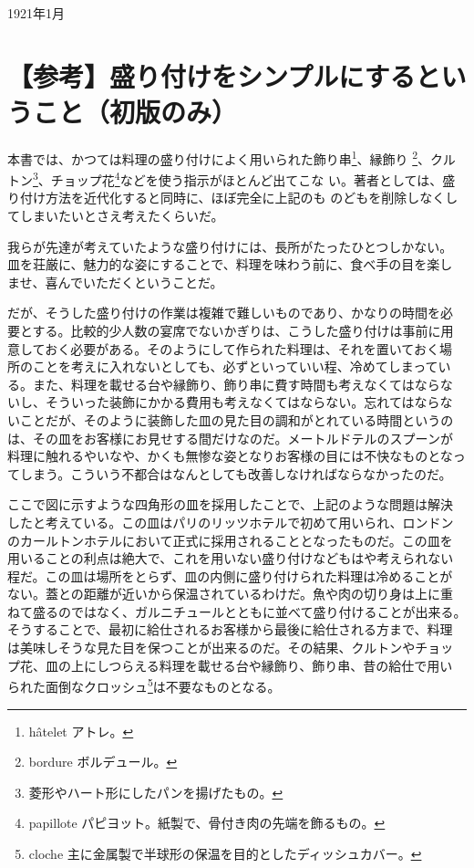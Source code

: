 \begin{flushright}
1921年1月
\end{flushright}

\newpage
\small
{}

\hypertarget{remarque-sur-la-simplification-des-procedes-de-dressage}{%
\section{【参考】盛り付けをシンプルにするということ（初版のみ）}\label{remarque-sur-la-simplification-des-procedes-de-dressage}}

本書では、かつては料理の盛り付けによく用いられた飾り串\footnote{hâtelet
  アトレ。}、縁飾り \footnote{bordure ボルデュール。}、クルトン\footnote{菱形やハート形にしたパンを揚げたもの。}、チョップ花\footnote{papillote
  パピヨット。紙製で、骨付き肉の先端を飾るもの。}などを使う指示がほとんど出てこな
い。著者としては、盛り付け方法を近代化すると同時に、ほぼ完全に上記のも
のどもを削除しなくしてしまいたいとさえ考えたくらいだ。

我らが先達が考えていたような盛り付けには、長所がたったひとつしかない。
皿を荘厳に、魅力的な姿にすることで、料理を味わう前に、食べ手の目を楽し
ませ、喜んでいただくということだ。

だが、そうした盛り付けの作業は複雑で難しいものであり、かなりの時間を必
要とする。比較的少人数の宴席でないかぎりは、こうした盛り付けは事前に用
意しておく必要がある。そのようにして作られた料理は、それを置いておく場
所のことを考えに入れないとしても、必ずといっていい程、冷めてしまってい
る。また、料理を載せる台や縁飾り、飾り串に費す時間も考えなくてはならな
いし、そういった装飾にかかる費用も考えなくてはならない。忘れてはならな
いことだが、そのように装飾した皿の見た目の調和がとれている時間というの
は、その皿をお客様にお見せする間だけなのだ。メートルドテルのスプーンが
料理に触れるやいなや、かくも無惨な姿となりお客様の目には不快なものとなっ
てしまう。こういう不都合はなんとしても改善しなければならなかったのだ。

ここで図に示すような四角形の皿を採用したことで、上記のような問題は解決
したと考えている。この皿はパリのリッツホテルで初めて用いられ、ロンドン
のカールトンホテルにおいて正式に採用されることとなったものだ。この皿を
用いることの利点は絶大で、これを用いない盛り付けなどもはや考えられない
程だ。この皿は場所をとらず、皿の内側に盛り付けられた料理は冷めることが
ない。蓋との距離が近いから保温されているわけだ。魚や肉の切り身は上に重
ねて盛るのではなく、ガルニチュールとともに並べて盛り付けることが出来る。
そうすることで、最初に給仕されるお客様から最後に給仕される方まで、料理
は美味しそうな見た目を保つことが出来るのだ。その結果、クルトンやチョッ
プ花、皿の上にしつらえる料理を載せる台や縁飾り、飾り串、昔の給仕で用い
られた面倒なクロッシュ\footnote{cloche
  主に金属製で半球形の保温を目的としたディッシュカバー。}は不要なものとなる。

